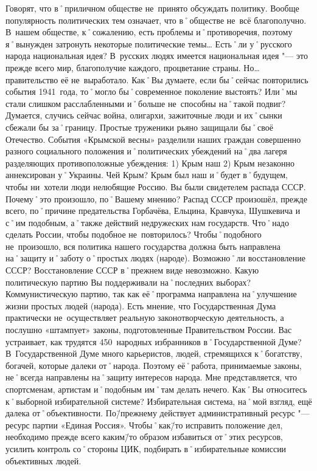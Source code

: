 \begin{drama}
\pagebreak
	
	\maxspeaks Говорят, что в˚приличном обществе не~принято обсуждать политику. Вообще популярность политических тем означает, что в˚обществе не~всё благополучно. В~нашем обществе, к˚сожалению, есть проблемы и˚противоречия, поэтому я˚вынужден затронуть некоторые политические темы… Есть˚ли у˚русского народа национальная идея?
	\michaelspeaks В~русских людях имеется национальная идея "--- это прежде всего мир, благополучие каждого, процветание страны. Но… правительство её не~выработало.
	\maxspeaks Как˚Вы думаете, если бы˚сейчас повторились события 1941~года, то˚могло бы˚современное поколение выстоять? Или˚мы стали слишком расслабленными и˚больше не~способны на˚такой подвиг?
	\michaelspeaks Думается, случись сейчас война, олигархи, зажиточные люди и их˚сынки сбежали бы за˚границу. Простые труженики рьяно защищали бы˚своё Отечество.
	\maxspeaks События «Крымской весны» разделили наших граждан совершенно разного социального положения и˚политических убеждений на˚два лагеря разделяющих противоположные убеждения: 1) Крым наш 2) Крым незаконно аннексирован у˚Украины. Чей Крым?
	\michaelspeaks Крым был наш и˚будет в˚будущем, чтобы ни~хотели люди нелюбящие Россию.
	\maxspeaks Вы были свидетелем распада СССР. Почему˚это произошло, по˚Вашему мнению? 
	\michaelspeaks Распад СССР произошёл, прежде всего, по˚причине предательства Горбачёва, Ельцина, Кравчука, Шушкевича и с˚им подобным, а˚также действий недружеских нам государств.	
	\maxspeaks Что˚надо сделать России, чтобы подобное не~повторилось? 
	\michaelspeaks Чтобы˚подобного не~произошло, вся политика нашего государства должна быть направлена на˚защиту и˚заботу о˚простых людях (народе).
	\maxspeaks Возможно˚ли восстановление СССР?
	\michaelspeaks Восстановление СССР в˚прежнем виде невозможно. 
	\maxspeaks Какую политическую партию Вы поддерживали на˚последних выборах? 
	\michaelspeaks Коммунистическую партию, так как её˚программа направлена на˚улучшение жизни простых людей (народа).
	\maxspeaks Есть мнение, что Государственная Дума практически не~осуществляет реальную законотворческую деятельность, а послушно «штампует» законы, подготовленные Правительством России. Вас устраивает, как трудятся 450~народных избранников в˚Государственной Думе? 
	\michaelspeaks В~Государственной Думе много карьеристов, людей, стремящихся к˚богатству, богачей, которые далеки от˚народа. Поэтому её˚работа, принимаемые законы, не˚всегда направлены на˚защиту интересов народа. Мне представляется, что спортсменам, артистам и˚подобным им˚там делать нечего.
	\maxspeaks Как˚Вы относитесь к˚выборной избирательной системе? 
	\michaelspeaks Избирательная система, на˚мой взгляд, ещё далека от˚объективности. По\=/прежнему действует административный ресурс "--- ресурс партии «Единая Россия». Чтобы˚как\=/то исправить положение дел, необходимо прежде всего каким\=/то образом избавиться от˚этих ресурсов, усилить контроль со˚стороны ЦИК, подбирать в˚избирательные комиссии объективных людей.	
	

\end{drama}
